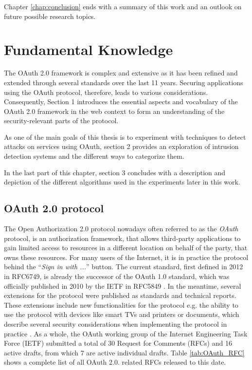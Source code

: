 \documentclass[
    fontsize=12pt,
    headings=small,
    parskip=half,           %
    bibliography=totoc,
    numbers=noenddot,       %
    open=any,               %
    ]{scrreprt}
\begin{document}
Chapter \ref{chap:conclusion} ends with a summary of this work and an outlook on future possible research topics.


\chapter{Fundamental Knowledge}
\label{chap:fundamental_knowledge}
The OAuth 2.0 framework is complex and extensive as it has been refined and extended through several standards over the last 11 years. Securing applications using the OAuth protocol, therefore, leads to various considerations. Consequently, Section 1 introduces the essential aspects and vocabulary of the OAuth 2.0 framework in the web context to form an understanding of the security-relevant parts of the protocol.

As one of the main goals of this thesis is to experiment with techniques to detect attacks on services using OAuth, section 2 provides an exploration of intrusion detection systems and the different ways to categorize them.

In the last part of this chapter, section 3 concludes with a description and depiction of the different algorithms used in the experiments later in this work.

\section{OAuth 2.0 protocol}
The Open Authorization 2.0 protocol nowadays often referred to as the
\emph{OAuth} protocol, is an authorization framework, that allows third-party
applications to gain limited access to resources in a different location on
behalf of the party, that owns these resources. For many users of the Internet,
it is in practice the protocol behind the ``\emph{Sign in with ...}'' button.
The current standard, first defined in 2012 in RFC6749, is already the
successor of the OAuth 1.0 standard, which was officially published in 2010 by
the IETF in RFC5849 \cite{hammer2010rfc}. In the meantime, several extensions
for the protocol were published as standards and technical reports. These
extensions include new functionalities for the protocol e.g. the ability to use
the protocol with devices like smart TVs and printers \cite{denniss2019oauth}
or documents, which describe several security considerations when implementing
the protocol in practice \cite{lodderstedt2020oauth}. As a whole, the OAuth
working group of the Internet Engineering Task Force (IETF) submitted a total
of 30 Request for Comments (RFCs) and 16 active drafts, from which 7 are active
individual drafts. Table \ref{tab:OAuth_RFC} shows a complete list of all OAuth 2.0. related RFCs released to this date. 
\end{document}
